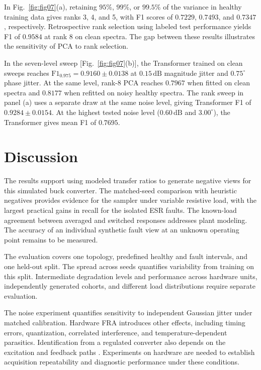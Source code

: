 \documentclass[journal]{IEEEtran}
\newcommand{\Fmain}{\mathrm{F1}_{0.975}}
\begin{document}
In Fig.~\ref{fig:fig07}(a), retaining $95\%$, $99\%$, or $99.5\%$ of the variance in healthy training data gives ranks 3, 4, and 5, with F1 scores of $0.7229$, $0.7493$, and $0.7347$, respectively. Retrospective rank selection using labeled test performance yields F1 of $0.9584$ at rank 8 on clean spectra. The gap between these results illustrates the sensitivity of PCA to rank selection.

In the seven-level sweep [Fig.~\ref{fig:fig07}(b)], the Transformer trained on clean sweeps reaches $\Fmain=0.9160\pm0.0138$ at $0.15\,\mathrm{dB}$ magnitude jitter and $0.75^\circ$ phase jitter. At the same level, rank-8 PCA reaches $0.7967$ when fitted on clean spectra and $0.8177$ when refitted on noisy healthy spectra. The rank sweep in panel (a) uses a separate draw at the same noise level, giving Transformer F1 of $0.9284\pm0.0154$. At the highest tested noise level ($0.60\,\mathrm{dB}$ and $3.00^\circ$), the Transformer gives mean F1 of $0.7695$.

\section{Discussion}\label{sec:7}

The results support using modeled transfer ratios to generate negative views for this simulated buck converter. The matched-seed comparison with heuristic negatives provides evidence for the sampler under variable resistive load, with the largest practical gains in recall for the isolated ESR faults. The known-load agreement between averaged and switched responses addresses plant modeling. The accuracy of an individual synthetic fault view at an unknown operating point remains to be measured.

The evaluation covers one topology, predefined healthy and fault intervals, and one held-out split. The spread across seeds quantifies variability from training on this split. Intermediate degradation levels and performance across hardware units, independently generated cohorts, and different load distributions require separate evaluation.

The noise experiment quantifies sensitivity to independent Gaussian jitter under matched calibration. Hardware FRA introduces other effects, including timing errors, quantization, correlated interference, and temperature-dependent parasitics. Identification from a regulated converter also depends on the excitation and feedback paths \cite{roinila2021frequency}. Experiments on hardware are needed to establish acquisition repeatability and diagnostic performance under these conditions.
\end{document}
